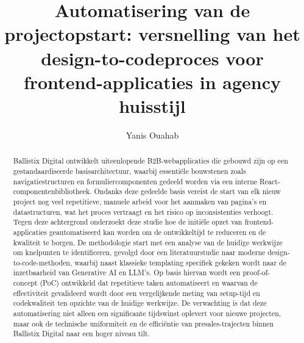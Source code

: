 \documentclass{hogent-article}
\title{Automatisering van de projectopstart: versnelling van het design-to-codeproces voor frontend-applicaties in agency huisstijl}
\author{Yanis Ouahab}
\begin{document}
\begin{abstract}
Ballistix Digital ontwikkelt uiteenlopende B2B-webapplicaties die gebouwd zijn op een gestandaardiseerde basisarchitectuur, waarbij essentiële bouwstenen zoals navigatiestructuren en formuliercomponenten gedeeld worden via een interne React-componentenbibliotheek. Ondanks deze gedeelde basis vereist de start van elk nieuw project nog veel repetitieve, manuele arbeid voor het aanmaken van pagina’s en datastructuren, wat het proces vertraagt en het risico op inconsistenties verhoogt. Tegen deze achtergrond onderzoekt deze studie hoe de initiële opzet van frontend-applicaties geautomatiseerd kan worden om de ontwikkeltijd te reduceren en de kwaliteit te borgen. De methodologie start met een analyse van de huidige werkwijze om knelpunten te identificeren, gevolgd door een literatuurstudie naar moderne design-to-code-methoden, waarbij naast klassieke templating specifiek gekeken wordt naar de inzetbaarheid van Generative AI en LLM's. Op basis hiervan wordt een proof-of-concept (PoC) ontwikkeld dat repetitieve taken automatiseert en waarvan de effectiviteit gevalideerd wordt door een vergelijkende meting van setup-tijd en codekwaliteit ten opzichte van de huidige werkwijze. De verwachting is dat deze automatisering niet alleen een significante tijdswinst oplevert voor nieuwe projecten, maar ook de technische uniformiteit en de efficiëntie van presales-trajecten binnen Ballistix Digital naar een hoger niveau tilt.
\end{abstract}

\tableofcontents



\printbibliography[heading=bibintoc]
\end{document}
